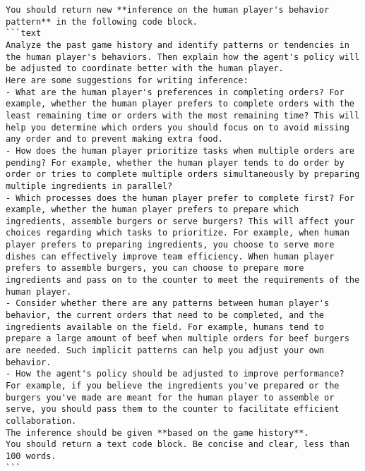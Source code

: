 \begin{lstlisting}
You should return new **inference on the human player's behavior pattern** in the following code block.
```text
Analyze the past game history and identify patterns or tendencies in the human player's behaviors. Then explain how the agent's policy will be adjusted to coordinate better with the human player.
Here are some suggestions for writing inference:
- What are the human player's preferences in completing orders? For example, whether the human player prefers to complete orders with the least remaining time or orders with the most remaining time? This will help you determine which orders you should focus on to avoid missing any order and to prevent making extra food.
- How does the human player prioritize tasks when multiple orders are pending? For example, whether the human player tends to do order by order or tries to complete multiple orders simultaneously by preparing multiple ingredients in parallel?
- Which processes does the human player prefer to complete first? For example, whether the human player prefers to prepare which ingredients, assemble burgers or serve burgers? This will affect your choices regarding which tasks to prioritize. For example, when human player prefers to preparing ingredients, you choose to serve more dishes can effectively improve team efficiency. When human player prefers to assemble burgers, you can choose to prepare more ingredients and pass on to the counter to meet the requirements of the human player.
- Consider whether there are any patterns between human player's behavior, the current orders that need to be completed, and the ingredients available on the field. For example, humans tend to prepare a large amount of beef when multiple orders for beef burgers are needed. Such implicit patterns can help you adjust your own behavior.
- How the agent's policy should be adjusted to improve performance? For example, if you believe the ingredients you've prepared or the burgers you've made are meant for the human player to assemble or serve, you should pass them to the counter to facilitate efficient collaboration.
The inference should be given **based on the game history**.
You should return a text code block. Be concise and clear, less than 100 words.
```
\end{lstlisting}